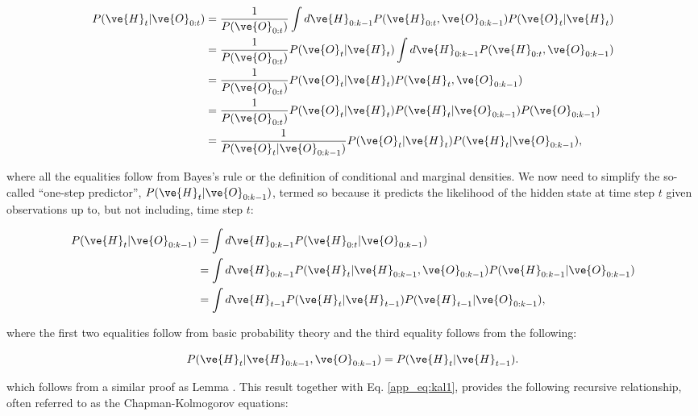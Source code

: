 \documentclass{article}
\begin{document}
\begin{subequations}
\begin{align}
 P(\ve{H}_t | \ve{O}_{0:t}) &= \frac{1}{P(\ve{O}_{0:t})} \int d\ve{H}_{0:k-1}  P(\ve{H}_{0:t}, \ve{O}_{0:k-1}) P(\ve{O}_t | \ve{H}_t)\\
 &= \frac{1}{P(\ve{O}_{0:t})} P(\ve{O}_t | \ve{H}_t) \int d\ve{H}_{0:k-1}  P(\ve{H}_{0:t}, \ve{O}_{0:k-1}) \\
 &= \frac{1}{P(\ve{O}_{0:t})} P(\ve{O}_t|\ve{H}_t) P(\ve{H}_t, \ve{O}_{0:k-1}) \\
 &= \frac{1}{P(\ve{O}_{0:t})}  P(\ve{O}_t|\ve{H}_t) P(\ve{H}_t | \ve{O}_{0:k-1}) P(\ve{O}_{0:k-1})\\ \label{app_eq:kal1}
 &= \frac{1}{P(\ve{O}_t | \ve{O}_{0:k-1})} P(\ve{O}_t|\ve{H}_t) P(\ve{H}_t | \ve{O}_{0:k-1}), 
\end{align}
\end{subequations}

\noindent where all the equalities follow from Bayes's rule or the definition of conditional and marginal densities.  We now need to simplify the so-called ``one-step predictor'', $P(\ve{H}_t | \ve{O}_{0:k-1})$, termed so because it predicts the likelihood of the hidden state at time step $t$ given observations up to, but not including, time step $t$:

\begin{subequations}
\begin{align} \label{app_eq:x|y2}
P(\ve{H}_t|\ve{O}_{0:k-1}) &= \int d\ve{H}_{0:k-1} P(\ve{H}_{0:t} | \ve{O}_{0:k-1})\\
 &=\int d\ve{H}_{0:k-1} P(\ve{H}_t | \ve{H}_{0:k-1}, \ve{O}_{0:k-1}) P(\ve{H}_{0:k-1}|\ve{O}_{0:k-1})\\
 &=\int d\ve{H}_{t-1} P(\ve{H}_t|\ve{H}_{t-1}) P(\ve{H}_{t-1} | \ve{O}_{0:k-1}),
\end{align}
\end{subequations}

\noindent where the first two equalities follow from basic probability theory and the third equality follows from the following:

\begin{lemma} \label{lem:2}
\begin{equation}
P(\ve{H}_t | \ve{H}_{0:k-1}, \ve{O}_{0:k-1}) = P(\ve{H}_t | \ve{H}_{t-1}).
\end{equation}
\end{lemma}

\noindent which follows from a similar proof as Lemma \label{lem:2}.  This result together with Eq. \ref{app_eq:kal1}, provides the following recursive relationship, often referred to as the Chapman-Kolmogorov equations:
\end{document}
